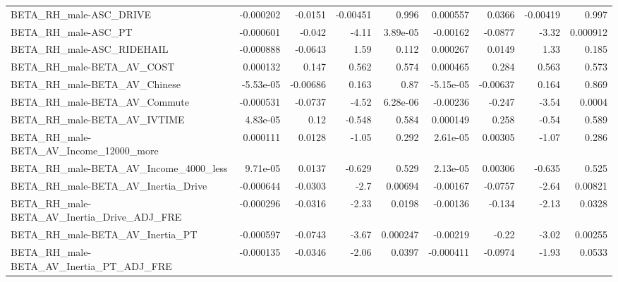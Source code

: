 \begin{tabular}{lrrrrrrrr}
BETA\_RH\_male-ASC\_DRIVE                             &   -0.000202 &      -0.0151 & -0.00451 &    0.996 &   0.000557 &      0.0366 &     -0.00419 &         0.997 \\
BETA\_RH\_male-ASC\_PT                                &   -0.000601 &       -0.042 &    -4.11 & 3.89e-05 &   -0.00162 &     -0.0877 &        -3.32 &      0.000912 \\
BETA\_RH\_male-ASC\_RIDEHAIL                          &   -0.000888 &      -0.0643 &     1.59 &    0.112 &   0.000267 &      0.0149 &         1.33 &         0.185 \\
BETA\_RH\_male-BETA\_AV\_COST                          &    0.000132 &        0.147 &    0.562 &    0.574 &   0.000465 &       0.284 &        0.563 &         0.573 \\
BETA\_RH\_male-BETA\_AV\_Chinese                       &   -5.53e-05 &     -0.00686 &    0.163 &     0.87 &  -5.15e-05 &    -0.00637 &        0.164 &         0.869 \\
BETA\_RH\_male-BETA\_AV\_Commute                       &   -0.000531 &      -0.0737 &    -4.52 & 6.28e-06 &   -0.00236 &      -0.247 &        -3.54 &        0.0004 \\
BETA\_RH\_male-BETA\_AV\_IVTIME                        &    4.83e-05 &         0.12 &   -0.548 &    0.584 &   0.000149 &       0.258 &        -0.54 &         0.589 \\
BETA\_RH\_male-BETA\_AV\_Income\_12000\_more             &    0.000111 &       0.0128 &    -1.05 &    0.292 &   2.61e-05 &     0.00305 &        -1.07 &         0.286 \\
BETA\_RH\_male-BETA\_AV\_Income\_4000\_less              &    9.71e-05 &       0.0137 &   -0.629 &    0.529 &   2.13e-05 &     0.00306 &       -0.635 &         0.525 \\
BETA\_RH\_male-BETA\_AV\_Inertia\_Drive                 &   -0.000644 &      -0.0303 &     -2.7 &  0.00694 &   -0.00167 &     -0.0757 &        -2.64 &       0.00821 \\
BETA\_RH\_male-BETA\_AV\_Inertia\_Drive\_ADJ\_FRE         &   -0.000296 &      -0.0316 &    -2.33 &   0.0198 &   -0.00136 &      -0.134 &        -2.13 &        0.0328 \\
BETA\_RH\_male-BETA\_AV\_Inertia\_PT                    &   -0.000597 &      -0.0743 &    -3.67 & 0.000247 &   -0.00219 &       -0.22 &        -3.02 &       0.00255 \\
BETA\_RH\_male-BETA\_AV\_Inertia\_PT\_ADJ\_FRE            &   -0.000135 &      -0.0346 &    -2.06 &   0.0397 &  -0.000411 &     -0.0974 &        -1.93 &        0.0533 \\

\end{tabular}
